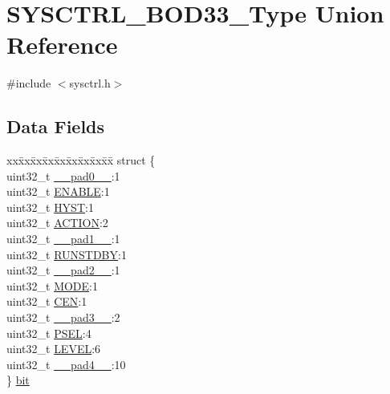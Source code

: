 \hypertarget{union_s_y_s_c_t_r_l___b_o_d33___type}{}\section{S\+Y\+S\+C\+T\+R\+L\+\_\+\+B\+O\+D33\+\_\+\+Type Union Reference}
\label{union_s_y_s_c_t_r_l___b_o_d33___type}


{\ttfamily \#include $<$sysctrl.\+h$>$}

\subsection*{Data Fields}
\begin{DoxyCompactItemize}
\item 
\begin{tabbing}
xx\=xx\=xx\=xx\=xx\=xx\=xx\=xx\=xx\=\kill
struct \{\\
\>uint32\_t \mbox{\hyperlink{union_s_y_s_c_t_r_l___b_o_d33___type_a3e57c2ef1c3ffb36722f000cc1156824}{\_\_pad0\_\_}}:1\\
\>uint32\_t \mbox{\hyperlink{union_s_y_s_c_t_r_l___b_o_d33___type_a66f979832c85e0692bd9422b05aff1f7}{ENABLE}}:1\\
\>uint32\_t \mbox{\hyperlink{union_s_y_s_c_t_r_l___b_o_d33___type_a2da063af1b85e87cd6a50876ed4204ff}{HYST}}:1\\
\>uint32\_t \mbox{\hyperlink{union_s_y_s_c_t_r_l___b_o_d33___type_aa10c3c9d16b6623ac71a144c598e7d82}{ACTION}}:2\\
\>uint32\_t \mbox{\hyperlink{union_s_y_s_c_t_r_l___b_o_d33___type_a6712ba6dd1d5b43d2d56ff8ac4e275a7}{\_\_pad1\_\_}}:1\\
\>uint32\_t \mbox{\hyperlink{union_s_y_s_c_t_r_l___b_o_d33___type_a5656560aef3eaf5aac89b68b9fe39c3a}{RUNSTDBY}}:1\\
\>uint32\_t \mbox{\hyperlink{union_s_y_s_c_t_r_l___b_o_d33___type_a9ce12a63de64ef64ae2d59d128251cae}{\_\_pad2\_\_}}:1\\
\>uint32\_t \mbox{\hyperlink{union_s_y_s_c_t_r_l___b_o_d33___type_aad9612db6a93afb1482213d2d36f1c5e}{MODE}}:1\\
\>uint32\_t \mbox{\hyperlink{union_s_y_s_c_t_r_l___b_o_d33___type_ae975828c92fb396da9afb42c4689cf3f}{CEN}}:1\\
\>uint32\_t \mbox{\hyperlink{union_s_y_s_c_t_r_l___b_o_d33___type_a4854608c0e776f0704a4d9a4b98ea57d}{\_\_pad3\_\_}}:2\\
\>uint32\_t \mbox{\hyperlink{union_s_y_s_c_t_r_l___b_o_d33___type_a62ec9f88459a8b7cc6a70915d69d961d}{PSEL}}:4\\
\>uint32\_t \mbox{\hyperlink{union_s_y_s_c_t_r_l___b_o_d33___type_a7b6a1f8efe29068f9a3f70042d8f760e}{LEVEL}}:6\\
\>uint32\_t \mbox{\hyperlink{union_s_y_s_c_t_r_l___b_o_d33___type_a7b2edc85d90e34c4435951e1e5c59517}{\_\_pad4\_\_}}:10\\
\} \mbox{\hyperlink{union_s_y_s_c_t_r_l___b_o_d33___type_a638fe21d792b5ef2af01d3223f76d266}{bit}}\\


\end{tabbing}
\end{DoxyCompactItemize}
